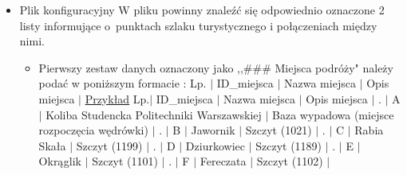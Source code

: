 \documentclass[10pt,oneside]{article}
\begin{document}
\begin{itemize}
	\item Plik konfiguracyjny \newline W pliku powinny znale\'zć się odpowiednio oznaczone 2 listy informujące o~punktach szlaku turystycznego i połączeniach między nimi.
	\begin{itemize}
		\item Pierwszy zestaw danych oznaczony jako ,,\#\#\# Miejsca podróży" należy podać w poniższym formacie : \newline
		Lp. $\vert$ ID\_miejsca $\vert$ Nazwa miejsca $\vert$ Opis miejsca $\vert$
		\newline \newline
		\underline{Przykład}
		\newline \newline
		Lp.$\vert$ ID\_miejsca $\vert$ Nazwa miejsca $\vert$ Opis miejsca $\vert$ . $\vert$ A $\vert$ Koliba Studencka Politechniki Warszawskiej $\vert$ Baza wypadowa (miejsce rozpoczęcia wędrówki) $\vert$ . $\vert$ B $\vert$ Jawornik $\vert$ Szczyt (1021) $\vert$ . $\vert$ C $\vert$ Rabia Skała $\vert$ Szczyt (1199) $\vert$ . $\vert$ D $\vert$ Dziurkowiec $\vert$ Szczyt (1189) $\vert$ . $\vert$ E $\vert$ Okrąglik $\vert$ Szczyt (1101) $\vert$ . $\vert$ F $\vert$ Fereczata $\vert$ Szczyt (1102) $\vert$ \newline
		

\end{itemize}
\end{itemize}
\end{document}
